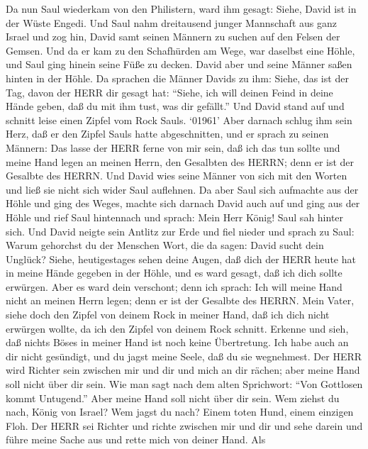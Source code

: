  Da nun Saul wiederkam von den Philistern, ward ihm gesagt:
Siehe, David ist in der Wüste Engedi.  Und Saul nahm
dreitausend junger Mannschaft aus ganz Israel und zog hin, David samt
seinen Männern zu suchen auf den Felsen der Gemsen.  Und da
er kam zu den Schafhürden am Wege, war daselbst eine Höhle, und Saul
ging hinein seine Füße zu decken. David aber und seine Männer saßen
hinten in der Höhle.  Da sprachen die Männer Davids zu ihm:
Siehe, das ist der Tag, davon der HERR dir gesagt hat: ``Siehe, ich will
deinen Feind in deine Hände geben, daß du mit ihm tust, was dir
gefällt.'' Und David stand auf und schnitt leise einen Zipfel vom Rock
Sauls.  `01961' Aber darnach schlug ihm sein Herz, daß er
den Zipfel Sauls hatte abgeschnitten,  und er sprach zu
seinen Männern: Das lasse der HERR ferne von mir sein, daß ich das tun
sollte und meine Hand legen an meinen Herrn, den Gesalbten des HERRN;
denn er ist der Gesalbte des HERRN.  Und David wies seine
Männer von sich mit den Worten und ließ sie nicht sich wider Saul
auflehnen. Da aber Saul sich aufmachte aus der Höhle und ging des Weges,
 machte sich darnach David auch auf und ging aus der Höhle
und rief Saul hintennach und sprach: Mein Herr König! Saul sah hinter
sich. Und David neigte sein Antlitz zur Erde und fiel nieder
 und sprach zu Saul: Warum gehorchst du der Menschen Wort,
die da sagen: David sucht dein Unglück?  Siehe,
heutigestages sehen deine Augen, daß dich der HERR heute hat in meine
Hände gegeben in der Höhle, und es ward gesagt, daß ich dich sollte
erwürgen. Aber es ward dein verschont; denn ich sprach: Ich will meine
Hand nicht an meinen Herrn legen; denn er ist der Gesalbte des HERRN.
 Mein Vater, siehe doch den Zipfel von deinem Rock in
meiner Hand, daß ich dich nicht erwürgen wollte, da ich den Zipfel von
deinem Rock schnitt. Erkenne und sieh, daß nichts Böses in meiner Hand
ist noch keine Übertretung. Ich habe auch an dir nicht gesündigt, und du
jagst meine Seele, daß du sie wegnehmest.  Der HERR wird
Richter sein zwischen mir und dir und mich an dir rächen; aber meine
Hand soll nicht über dir sein.  Wie man sagt nach dem alten
Sprichwort: ``Von Gottlosen kommt Untugend.'' Aber meine Hand soll nicht
über dir sein.  Wem ziehst du nach, König von Israel? Wem
jagst du nach? Einem toten Hund, einem einzigen Floh.  Der
HERR sei Richter und richte zwischen mir und dir und sehe darein und
führe meine Sache aus und rette mich von deiner Hand.  Als
